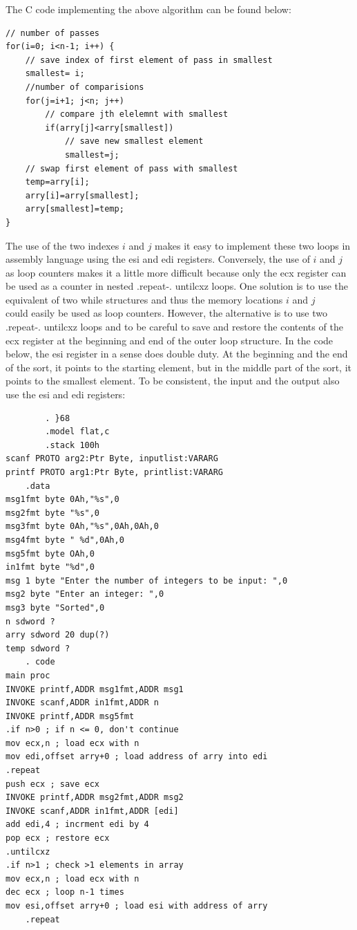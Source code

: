 \documentclass[10pt]{book}
\begin{document}
\begin{center}
\begin{center}
\begin{center}
The C code implementing the above algorithm can be found below:

\begin{verbatim}
// number of passes
for(i=0; i<n-1; i++) {
    // save index of first element of pass in smallest
    smallest= i;
    //number of comparisions
    for(j=i+1; j<n; j++)
        // compare jth elelemnt with smallest
        if(arry[j]<arry[smallest])
            // save new smallest element
            smallest=j;
    // swap first element of pass with smallest
    temp=arry[i];
    arry[i]=arry[smallest];
    arry[smallest]=temp;
}
\end{verbatim}

The use of the two indexes $i$ and $j$ makes it easy to implement these two loops in assembly language using the esi and edi registers. Conversely, the use of $i$ and $j$ as loop counters makes it a little more difficult because only the ecx register can be used as a counter in nested .repeat-. untilcxz loops. One solution is to use the equivalent of two while structures and thus the memory locations $i$ and $j$\\
could easily be used as loop counters. However, the alternative is to use two .repeat-. untilcxz loops and to be careful to save and restore the contents of the ecx register at the beginning and end of the outer loop structure. In the code below, the esi register in a sense does double duty. At the beginning and the end of the sort, it points to the starting element, but in the middle part of the sort, it points to the smallest element. To be consistent, the input and the output also use the esi and edi registers:

\begin{verbatim}
        . }68
        .model flat,c
        .stack 100h
scanf PROTO arg2:Ptr Byte, inputlist:VARARG
printf PROTO arg1:Ptr Byte, printlist:VARARG
    .data
msg1fmt byte 0Ah,"%s",0
msg2fmt byte "%s",0
msg3fmt byte 0Ah,"%s",0Ah,0Ah,0
msg4fmt byte " %d",0Ah,0
msg5fmt byte OAh,0
in1fmt byte "%d",0
msg 1 byte "Enter the number of integers to be input: ",0
msg2 byte "Enter an integer: ",0
msg3 byte "Sorted",0
n sdword ?
arry sdword 20 dup(?)
temp sdword ?
    . code
main proc
INVOKE printf,ADDR msg1fmt,ADDR msg1
INVOKE scanf,ADDR in1fmt,ADDR n
INVOKE printf,ADDR msg5fmt
.if n>0 ; if n <= 0, don't continue
mov ecx,n ; load ecx with n
mov edi,offset arry+0 ; load address of arry into edi
.repeat
push ecx ; save ecx
INVOKE printf,ADDR msg2fmt,ADDR msg2
INVOKE scanf,ADDR in1fmt,ADDR [edi]
add edi,4 ; incrment edi by 4
pop ecx ; restore ecx
.untilcxz
.if n>1 ; check >1 elements in array
mov ecx,n ; load ecx with n
dec ecx ; loop n-1 times
mov esi,offset arry+0 ; load esi with address of arry
    .repeat
\end{verbatim}


\end{center}
\end{center}
\end{center}
\end{document}

